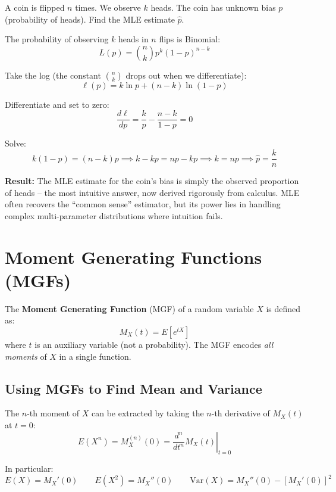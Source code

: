 \documentclass[11pt, letterpaper]{article}
\begin{document}
\begin{tcolorbox}[colback=part5bg, colframe=sectionteal,
  title={\bfseries Problem}, arc=3pt, boxrule=1pt]
A coin is flipped $n$ times. We observe $k$ heads. The coin has unknown bias $p$ (probability of heads). Find the MLE estimate $\hat{p}$.
\end{tcolorbox}

The probability of observing $k$ heads in $n$ flips is Binomial:
\[
  L(p) = \binom{n}{k} p^k (1-p)^{n-k}
\]

Take the log (the constant $\binom{n}{k}$ drops out when we differentiate):
\[
  \ell(p) = k \ln p + (n-k) \ln(1-p)
\]

Differentiate and set to zero:
\[
  \frac{d\ell}{dp} = \frac{k}{p} - \frac{n-k}{1-p} = 0
\]

Solve:
\[
  k(1-p) = (n-k)p \implies k - kp = np - kp \implies k = np \implies \boxed{\hat{p} = \frac{k}{n}}
\]

\begin{tcolorbox}[colback=part5bg, colframe=sectionteal, arc=3pt, boxrule=1pt]
\textbf{Result:} The MLE estimate for the coin's bias is simply the observed proportion of heads -- the most intuitive answer, now derived rigorously from calculus. MLE often recovers the ``common sense'' estimator, but its power lies in handling complex multi-parameter distributions where intuition fails.
\end{tcolorbox}

\section*{Moment Generating Functions (MGFs)}

The \textbf{Moment Generating Function} (MGF) of a random variable $X$ is defined as:
\[
  M_X(t) = E\!\left[e^{tX}\right]
\]
where $t$ is an auxiliary variable (not a probability). The MGF encodes \emph{all moments} of $X$ in a single function.

\subsection*{Using MGFs to Find Mean and Variance}

The $n$-th moment of $X$ can be extracted by taking the $n$-th derivative of $M_X(t)$ at $t = 0$:
\[
  E(X^n) = M_X^{(n)}(0) = \left.\frac{d^n}{dt^n} M_X(t)\right|_{t=0}
\]

In particular:
\[
  E(X) = M_X'(0) \qquad E(X^2) = M_X''(0) \qquad \text{Var}(X) = M_X''(0) - [M_X'(0)]^2
\]
\end{document}
